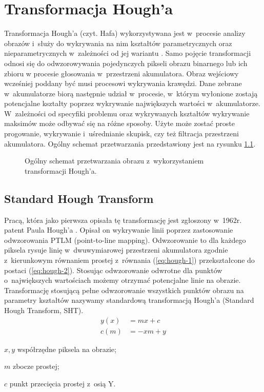 \chapter{Transformacja Hough'a}
\label{sec:hough}

Transformacja Hough'a (czyt. Hafa) wykorzystywana jest w~procesie analizy obrazów i~służy do wykrywania na nim kształtów parametrycznych oraz nieparametrycznych w~zależności od jej wariantu \cite{mukhopadhyay2015survey}. Samo pojęcie transformacji odnosi się do odwzorowywania pojedynczych pikseli obrazu binarnego lub ich zbioru w procesie głosowania w~przestrzeni akumulatora. Obraz wejściowy wcześniej poddany być musi procesowi wykrywania krawędzi. Dane zebrane w~akumulatorze biorą następnie udział w~procesie, w~którym wyłonione zostają potencjalne kształty poprzez wykrywanie największych wartości w~akumulatorze. W~zależności od specyfiki problemu oraz wykrywanych kształtów wykrywanie maksimów może odbywać się na różne sposoby. Użyte może zostać proste progowanie, wykrywanie i~uśrednianie skupisk, czy też filtracja przestrzeni akumulatora. Ogólny schemat przetwarzania przedstawiony jest na rysunku \ref{fig:hough}.

\begin{figure}
    \centering
    
    \caption{Ogólny schemat przetwarzania obrazu z~wykorzystaniem transformacji Hough'a.}
    \label{fig:hough}
\end{figure}

\section{Standard Hough Transform}

Pracą, która jako pierwsza opisała tę transformację jest zgłoszony w~1962r. patent Paula Hough'a \cite{hough1962method}. Opisał on wykrywanie linii poprzez zastosowanie odwzorowania PTLM (point-to-line mapping). Odwzorowanie to dla każdego piksela rysuje linię w~dwuwymiarowej przestrzeni akumulatora zgodnie z~kierunkowym równaniem prostej z~równania (\ref{eq:hough-1}) przekształcone do postaci (\ref{eq:hough-2}). Stosując odwzorowanie odwrotne dla punktów o~największych wartościach możemy otrzymać potencjalne linie na obrazie. Transformację stosującą pełne odwzorowanie wszystkich punktów obrazu na parametry kształtów nazywamy standardową transformacją Hough'a (Standard Hough Transform, SHT).
\begin{align}
    y(x) &= mx+c \label{eq:hough-1}\\
    c(m) &= -xm+y \label{eq:hough-2}
\end{align}
\begin{eqexpl}
    \item{$x, y$} współrzędne piksela na obrazie;
    \item{$m$} zbocze prostej;
    \item{$c$} punkt przecięcia prostej z~osią Y.
\end{eqexpl}

